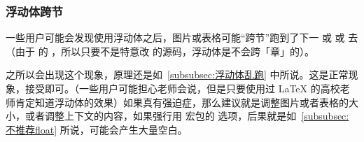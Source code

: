\subsubsection{浮动体跨节}

一些用户可能会发现使用浮动体之后，图片或表格可能“跨节”跑到了下一  或  或  去（由于  的 ，所以只要不是特意改  的源码，浮动体是不会跨「章」的）。

之所以会出现这个现象，原理还是如~\ref{subsubsec:浮动体乱跑} 中所说。这是正常现象，接受即可。（一些用户可能担心老师会说，但是只要使用过 \LaTeX{} 的高校老师肯定知道浮动体的效果）如果真有强迫症，那么建议就是调整图片或者表格的大小，或者调整上下文的内容，如果强行用  宏包的  选项，后果就是如~\ref{subsubsec:不推荐float} 所说，可能会产生大量空白。